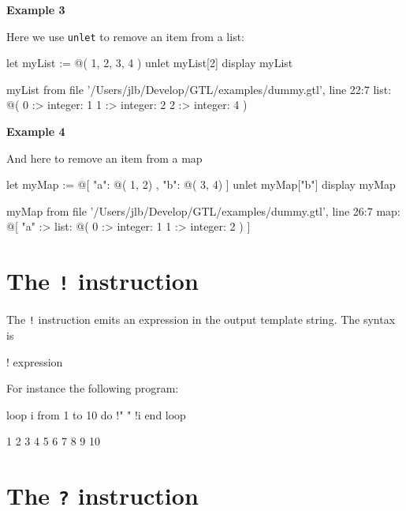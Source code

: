 \documentclass[10pt,openright,twosides,final]{memoir}
\newcommand{\gtlinline}[1]{\colorbox{light-blue}{\lstinline[language=gtl]{#1}}}
\newcommand{\examplen}[1]{\vspace{.75em}\noindent\textbf{Example #1}\vspace{0em}}
\begin{document}
\examplen{3}

\noindent Here we use \gtlinline{unlet} to remove an item from a list:

\begin{gtl}
let myList := @( 1, 2, 3, 4 )
unlet myList[2]
display myList
\end{gtl}

\begin{console}
myList from file '/Users/jlb/Develop/GTL/examples/dummy.gtl', line 22:7
    list: @(
        0 :>
            integer: 1
        1 :>
            integer: 2
        2 :>
            integer: 4
    )
\end{console}

\examplen{4}

\noindent And here to remove an item from a map

\begin{gtl}
let myMap := @[ "a": @( 1, 2) , "b": @( 3, 4) ]
unlet myMap["b"]
display myMap
\end{gtl}

\begin{console}
myMap from file '/Users/jlb/Develop/GTL/examples/dummy.gtl', line 26:7
    map: @[
        "a" :>
            list: @(
                0 :>
                    integer: 1
                1 :>
                    integer: 2
            )
    ]
\end{console}

\section{The \texttt{!} instruction}

The \gtlinline{!} instruction emits an expression in the output template string. The syntax is

\begin{gtl}
! expression
\end{gtl}

\noindent For instance the following program:

\begin{gtl}
loop i from 1 to 10 do
  !" " !i
end loop
\end{gtl}

\begin{templateoutput}
 1 2 3 4 5 6 7 8 9 10
\end{templateoutput}

\section{The \texttt{?} instruction}
\end{document}
